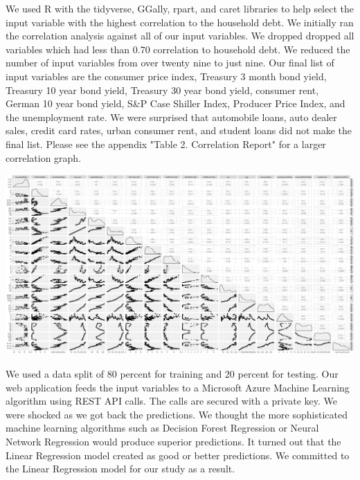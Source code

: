 \documentclass[sigconf,nonacm,11pt]{acmart}
\begin{document}
We used R with the tidyverse, GGally, rpart, and caret libraries to help select the input variable with the highest correlation to the household debt. We initially ran the correlation analysis against all of our input variables.   We dropped dropped all variables which had less than 0.70 correlation to household debt. We reduced the number of input variables from over twenty nine to just nine. Our final list of input variables are the consumer price index, Treasury 3 month bond yield, Treasury 10 year bond yield, Treasury 30 year bond yield, consumer rent, German 10 year bond yield, S&P Case Shiller Index, Producer Price Index, and the unemployment rate. We were surprised that automobile loans, auto dealer sales, credit card rates, urban consumer rent, and student loans did not make the final list. Please see the appendix "Table 2. Correlation Report" for a larger correlation graph.

\includegraphics[scale = 0.10]{teamfedcorrelation.png}

We used a data split of 80 percent for training and 20 percent for testing. Our web application feeds the input variables to a Microsoft Azure Machine Learning algorithm using REST API calls. The calls are secured with a private key.  We were shocked as we got back the predictions.  We thought the more sophisticated machine learning algorithms such as Decision Forest Regression or Neural Network Regression would produce  superior predictions. It turned out that the Linear Regression model created as good or better predictions.  We committed to the Linear Regression model for our study as a result.
\end{document}
